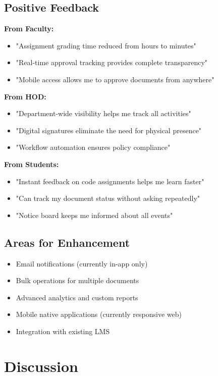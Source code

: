 \subsection{Positive Feedback}

\textbf{From Faculty:}
\begin{itemize}
\item "Assignment grading time reduced from hours to minutes"
\item "Real-time approval tracking provides complete transparency"
\item "Mobile access allows me to approve documents from anywhere"
\end{itemize}

\textbf{From HOD:}
\begin{itemize}
\item "Department-wide visibility helps me track all activities"
\item "Digital signatures eliminate the need for physical presence"
\item "Workflow automation ensures policy compliance"
\end{itemize}

\textbf{From Students:}
\begin{itemize}
\item "Instant feedback on code assignments helps me learn faster"
\item "Can track my document status without asking repeatedly"
\item "Notice board keeps me informed about all events"
\end{itemize}

\subsection{Areas for Enhancement}

\begin{itemize}
\item Email notifications (currently in-app only)
\item Bulk operations for multiple documents
\item Advanced analytics and custom reports
\item Mobile native applications (currently responsive web)
\item Integration with existing LMS
\end{itemize}

\section{Discussion}


